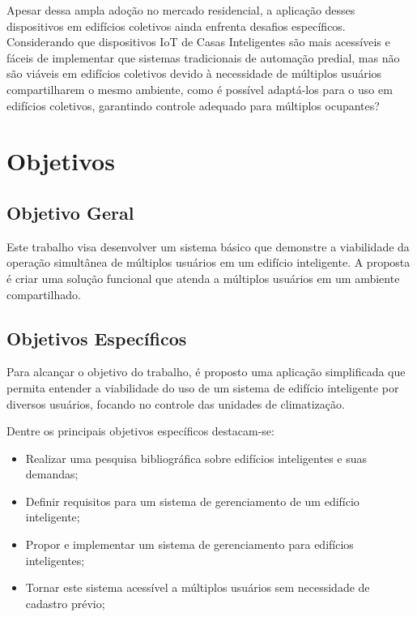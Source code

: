 Apesar dessa ampla adoção no mercado residencial, a aplicação desses dispositivos em edifícios coletivos ainda enfrenta desafios específicos.
Considerando que dispositivos IoT de Casas Inteligentes são mais acessíveis e fáceis de implementar que sistemas tradicionais de automação predial,
mas não são viáveis em edifícios coletivos devido à necessidade de múltiplos usuários compartilharem o mesmo ambiente, como é possível adaptá-los
para o uso em edifícios coletivos, garantindo controle adequado para múltiplos ocupantes?


\section{Objetivos}
\subsection{Objetivo Geral}
Este trabalho visa desenvolver um sistema básico que demonstre a viabilidade da operação simultânea de múltiplos usuários
em um edifício inteligente. A proposta é criar uma solução funcional que atenda a múltiplos usuários em um ambiente compartilhado. 

\subsection{Objetivos Específicos}

Para alcançar o objetivo do trabalho, é proposto uma aplicação simplificada que permita entender a viabilidade do uso de um 
sistema de edifício inteligente por diversos usuários, focando no controle das unidades de climatização.

Dentre os principais objetivos específicos destacam-se:

\begin{itemize}
    \item Realizar uma pesquisa bibliográfica sobre edifícios inteligentes e suas demandas;
    \item Definir requisitos para um sistema de gerenciamento de um edifício inteligente;
    \item Propor e implementar um sistema de gerenciamento para edifícios inteligentes;
    \item Tornar este sistema acessível a múltiplos usuários sem necessidade de cadastro prévio;
\end{itemize}

